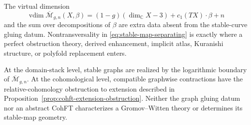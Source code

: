 \documentclass[11pt,letterpaper,twoside]{article}
\theoremstyle{plain}
\theoremstyle{definition}
\theoremstyle{remark}
\let\cite\citep
\newcommand{\vdim}{\operatorname{vdim}}
\begin{document}
The virtual dimension~\cite{behrendmanin1996,behrend1997}
\begin{equation}\label{eq:stable-map-vdim}
 \vdim\overline{\mathcal M}_{g,n}(X,\beta)
 =(1-g)(\dim_{\mathbb C}X-3)+c_1(TX)\cdot\beta+n
\end{equation}
and the sum over decompositions of \(\beta\) are extra data absent from the stable-curve gluing datum.  Nontransversality in \eqref{eq:stable-map-separating} is exactly where a perfect obstruction theory, derived enhancement, implicit atlas, Kuranishi structure, or polyfold replacement enters.

At the domain-stack level, stable graphs are realized by the logarithmic boundary of \(\overline{\mathcal M}_{g,n}\).  At the cohomological level, compatible graphwise contractions have the relative-cohomology obstruction to extension described in Proposition~\ref{prop:cohft-extension-obstruction}.  Neither the graph gluing datum nor an abstract CohFT characterizes a Gromov--Witten theory or determines its stable-map geometry.
\end{document}
